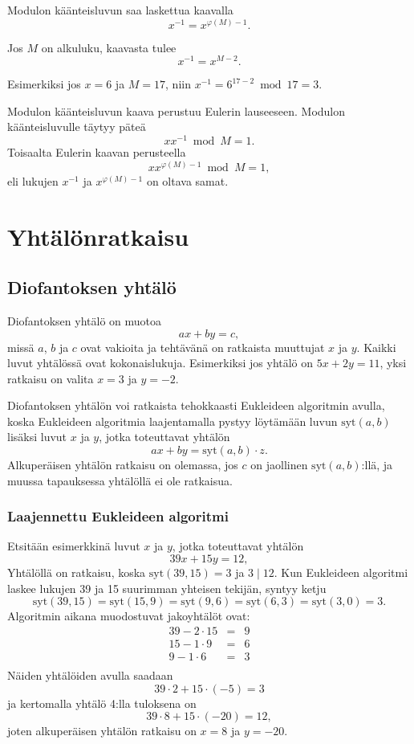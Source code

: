 Modulon käänteisluvun saa laskettua kaavalla
\[
x^{-1} = x^{\varphi(M)-1}.
\]

Jos $M$ on alkuluku, kaavasta tulee
\[
x^{-1} = x^{M-2}.
\]

Esimerkiksi jos $x=6$ ja $M=17$, niin
$x^{-1}=6^{17-2} \bmod 17 = 3$.

Modulon käänteisluvun kaava perustuu Eulerin
lauseeseen.
Modulon käänteisluvulle täytyy päteä
\[
x x^{-1} \bmod M = 1.
\]
Toisaalta Eulerin kaavan perusteella
\[
xx^{\varphi(M)-1} \bmod M = 1,
\]
eli lukujen $x^{-1}$ ja $x^{\varphi(M)-1}$ on oltava samat.

\section{Yhtälönratkaisu}

\subsection{Diofantoksen yhtälö}

Diofantoksen yhtälö on muotoa
\[ ax + by = c, \]
missä $a$, $b$ ja $c$ ovat vakioita
ja tehtävänä on ratkaista muuttujat $x$ ja $y$.
Kaikki luvut yhtälössä ovat kokonaislukuja.
Esimerkiksi jos yhtälö on $5x+2y=11$, yksi ratkaisu
on valita $x=3$ ja $y=-2$.

Diofantoksen yhtälön voi ratkaista
tehokkaasti Eukleideen algoritmin avulla,
koska Eukleideen algoritmia laajentamalla
pystyy löytämään luvun $\textrm{syt}(a,b)$
lisäksi luvut $x$ ja $y$,
jotka toteuttavat yhtälön
\[
ax + by = \textrm{syt}(a,b) \cdot z.
\]
Alkuperäisen yhtälön ratkaisu on olemassa, jos $c$ on
jaollinen $\textrm{syt}(a,b)$:llä,
ja muussa tapauksessa yhtälöllä ei ole ratkaisua.

\subsubsection*{Laajennettu Eukleideen algoritmi}

Etsitään esimerkkinä luvut $x$ ja $y$,
jotka toteuttavat yhtälön
\[
39x + 15y = 12,
\]
Yhtälöllä on ratkaisu, koska $\textrm{syt}(39,15)=3$
ja $3 \mid 12$.
Kun Eukleideen algoritmi laskee lukujen
39 ja 15 suurimman
yhteisen tekijän, syntyy ketju
\[
\textrm{syt}(39,15) = \textrm{syt}(15,9)
= \textrm{syt}(9,6) = \textrm{syt}(6,3)
= \textrm{syt}(3,0) = 3. \]
Algoritmin aikana muodostuvat jakoyhtälöt ovat:
\[
\begin{array}{lcl}
39 - 2 \cdot 15 & = & 9 \\
15 - 1 \cdot 9 & = & 6 \\
9 - 1 \cdot 6 & = & 3 \\
\end{array}
\]
Näiden yhtälöiden avulla saadaan
\[
39 \cdot 2 + 15 \cdot (-5) = 3
\]
ja kertomalla yhtälö 4:lla tuloksena on
\[
39 \cdot 8 + 15 \cdot (-20) = 12,
\]
joten alkuperäisen yhtälön ratkaisu on $x=8$ ja $y=-20$.

